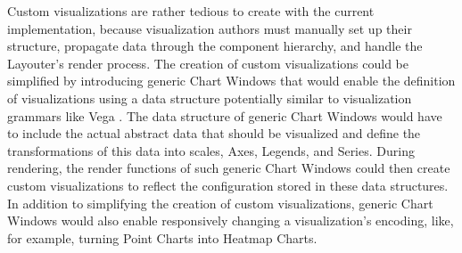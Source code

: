 Custom visualizations are rather tedious to create with the current
implementation, because visualization authors must manually set up
their structure, propagate data through the component hierarchy, and
handle the Layouter's render process. The creation of custom
visualizations could be simplified by introducing generic Chart
Windows that would enable the definition of visualizations using a
data structure potentially similar to visualization grammars like Vega
\parencite{Vega}.
The data structure of generic Chart Windows would have to include the
actual abstract data that should be visualized and define the
transformations of this data into scales, Axes, Legends, and Series.
During rendering, the render functions of such generic Chart Windows
could then create custom visualizations to reflect the configuration
stored in these data structures. In addition to simplifying the
creation of custom visualizations, generic Chart Windows would also
enable responsively changing a visualization's encoding, like, for
example, turning Point Charts into Heatmap Charts.





